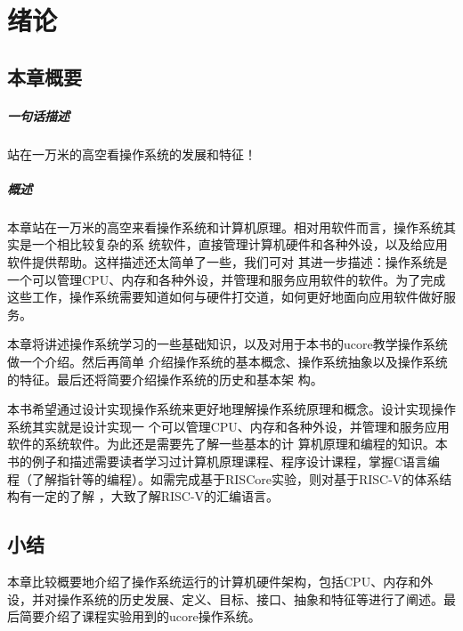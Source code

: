 
\chapter{绪论}\label{ch_intro}

\section{本章概要}

\paragraph{一句话描述}

站在一万米的高空看操作系统的发展和特征！

\paragraph{概述}

本章站在一万米的高空来看操作系统和计算机原理。相对用软件而言，操作系统其实是一个相比较复杂的系
统软件，直接管理计算机硬件和各种外设，以及给应用软件提供帮助。这样描述还太简单了一些，我们可对
其进一步描述：操作系统是一个可以管理CPU、内存和各种外设，并管理和服务应用软件的软件。为了完成
这些工作，操作系统需要知道如何与硬件打交道，如何更好地面向应用软件做好服务。

本章将讲述操作系统学习的一些基础知识，以及对用于本书的ucore教学操作系统做一个介绍。然后再简单
介绍操作系统的基本概念、操作系统抽象以及操作系统的特征。最后还将简要介绍操作系统的历史和基本架
构。

本书希望通过设计实现操作系统来更好地理解操作系统原理和概念。设计实现操作系统其实就是设计实现一
个可以管理CPU、内存和各种外设，并管理和服务应用软件的系统软件。为此还是需要先了解一些基本的计
算机原理和编程的知识。本书的例子和描述需要读者学习过计算机原理课程、程序设计课程，掌握C语言编
程（了解指针等的编程）。如需完成基于RISCore实验，则对基于RISC-V的体系结构有一定的了解
，大致了解RISC-V的汇编语言。






\section{小结}
本章比较概要地介绍了操作系统运行的计算机硬件架构，包括CPU、内存和外设，并对操作系统的历史发展、定义、目标、接口、抽象和特征等进行了阐述。最后简要介绍了课程实验用到的ucore操作系统。